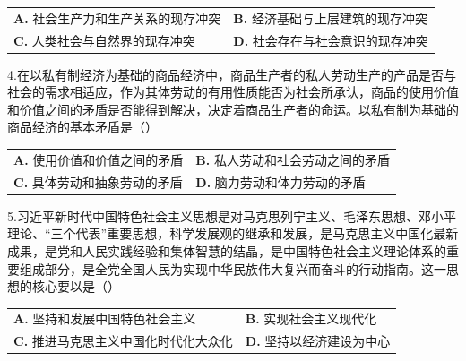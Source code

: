 \documentclass[UTF8,11pt]{ctexart}
\begin{document}
\begin{center}\begin{tabular}{>{\raggedright\arraybackslash}p{\dimexpr(\linewidth-4\tabcolsep)/2\relax}>{\raggedright\arraybackslash}p{\dimexpr(\linewidth-4\tabcolsep)/2\relax}}
\textbf{A.} 社会生产力和生产关系的现存冲突 & \textbf{B.} 经济基础与上层建筑的现存冲突\\[.35em]
\textbf{C.} 人类社会与自然界的现存冲突 & \textbf{D.} 社会存在与社会意识的现存冲突\\[.35em]\end{tabular}\end{center}

4.在以私有制经济为基础的商品经济中，商品生产者的私人劳动生产的产品是否与社会的需求相适应，作为其体劳动的有用性质能否为社会所承认，商品的使用价值和价值之间的矛盾是否能得到解决，决定着商品生产者的命运。以私有制为基础的商品经济的基本矛盾是（）


\begin{center}\begin{tabular}{>{\raggedright\arraybackslash}p{\dimexpr(\linewidth-4\tabcolsep)/2\relax}>{\raggedright\arraybackslash}p{\dimexpr(\linewidth-4\tabcolsep)/2\relax}}
\textbf{A.} 使用价值和价值之间的矛盾 & \textbf{B.} 私人劳动和社会劳动之间的矛盾\\[.35em]
\textbf{C.} 具体劳动和抽象劳动的矛盾 & \textbf{D.} 脑力劳动和体力劳动的矛盾\\[.35em]\end{tabular}\end{center}

5.习近平新时代中国特色社会主义思想是对马克思列宁主义、毛泽东思想、邓小平理论、“三个代表”重要思想，科学发展观的继承和发展，是马克思主义中国化最新成果，是党和人民实践经验和集体智慧的结晶，是中国特色社会主义理论体系的重要组成部分，是全党全国人民为实现中华民族伟大复兴而奋斗的行动指南。这一思想的核心要以是（）


\begin{center}\begin{tabular}{>{\raggedright\arraybackslash}p{\dimexpr(\linewidth-4\tabcolsep)/2\relax}>{\raggedright\arraybackslash}p{\dimexpr(\linewidth-4\tabcolsep)/2\relax}}
\textbf{A.} 坚持和发展中国特色社会主义 & \textbf{B.} 实现社会主义现代化\\[.35em]
\textbf{C.} 推进马克思主义中国化时代化大众化 & \textbf{D.} 坚持以经济建设为中心\\[.35em]\end{tabular}\end{center}
\end{document}
